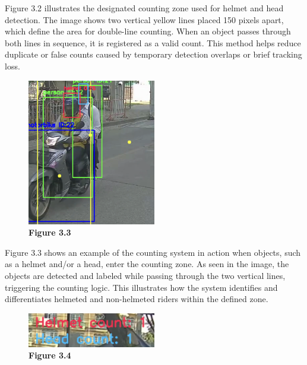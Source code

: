 	\noindent\hspace{2.5em}Figure 3.2 illustrates the designated counting zone used for helmet and head detection. The image shows two vertical yellow lines placed 150 pixels apart, which define the area for double-line counting. When an object passes through both lines in sequence, it is registered as a valid count. This method helps reduce duplicate or false counts caused by temporary detection overlaps or brief tracking loss.
	
	\begin{figure}[H] %
		\centering
		\includegraphics[width=0.5\textwidth]{headhel2.png}
		\vspace{0.5em}
		\caption*{\textbf{Figure 3.3}}
	\end{figure}
	
	\noindent\hspace{2.5em}Figure 3.3 shows an example of the counting system in action when objects, such as a helmet and/or a head, enter the counting zone. As seen in the image, the objects are detected and labeled while passing through the two vertical lines, triggering the counting logic. This illustrates how the system identifies and differentiates helmeted and non-helmeted riders within the defined zone.
	
	\begin{figure}[H] %
		\centering
		\includegraphics[width=0.5\textwidth]{headhel3.png}
		\vspace{0.5em}
		\caption*{\textbf{Figure 3.4}}
	\end{figure}
	
